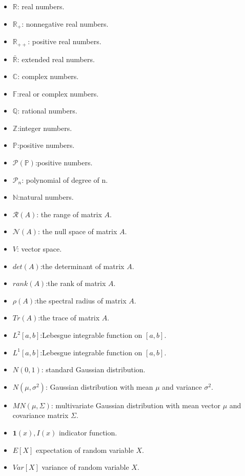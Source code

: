 \documentclass[oneside,hidelinks,12pt,letterpaper]{scrbook} %
\newcommand{\field}[1]  {\mathbb{#1}}
\newcommand{\R}{\mathbb{R}}
\newcommand{\RE}{\bar{\mathbb{R}}}
\newcommand{\F}{\mathbb{F}}
\newcommand{\PP}{\mathbb{P}}
\newcommand{\N}         {\field N}
\newcommand{\Z}         {\field Z}
\newcommand{\C}         {\field C}
\newcommand{\Q}         {\field Q}
\newcommand{\cP}{\mathcal{P}}
\newcommand{\cR}{\mathcal{R}}
\newcommand{\cN}{\mathcal{N}}
\theoremstyle{remark}
\theoremstyle{coloredRemark}
\theoremstyle{coloredNote}
\begin{document}
\begin{itemize}
	\item $\R$: real numbers.
	\item $\R_+$: nonnegative real numbers.
	\item $\R_{++}$: positive real numbers.
	\item $\RE$: extended real numbers.
	\item $\C$: complex numbers.
	\item $\F$:real or complex numbers.
	\item $\Q$: rational numbers.
	\item $\Z$:integer numbers.
	\item $\PP$:positive numbers.
	\item $\cP(\PP)$:positive numbers.
	\item $\cP_n$: polynomial of degree of n.
	\item $\N$:natural numbers.
	\item $\cR(A)$: the range of matrix $A$.
	\item $\cN(A)$: the null space of matrix $A$. 
		\item $V$: vector space.
		\item $det(A)$:the determinant of matrix $A$.
		\item $rank(A)$:the rank of matrix $A$.
		\item $\rho(A)$:the spectral radius of matrix $A$.
		\item $Tr(A)$:the trace of matrix $A$.	
		\item $L^2[a,b]$:Lebesgue integrable function on $[a,b]$.
		\item $L^1[a,b]$:Lebesgue integrable function on $[a,b]$.
		\item $N(0,1)$: standard Gaussian distribution.
		\item $N(\mu,\sigma^2)$: Gaussian distribution with mean $\mu$ and variance $\sigma^2$.
		\item $MN(\mu,\Sigma)$: multivariate Gaussian distribution with mean vector $\mu$ and covariance matrix $\Sigma$.
		\item $\bm{1}(x), I(x)$ indicator function.
		\item $E[X]$ expectation of random variable $X$.
		\item $Var[X]$ variance of random variable $X$.
\end{itemize}



\newpage

\hypersetup{colorlinks=false}
\end{document}
